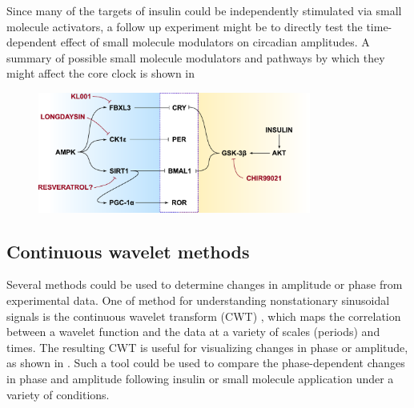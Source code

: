 Since many of the targets of insulin could be independently stimulated via small molecule activators, a follow up experiment might be to directly test the time-dependent effect of small molecule modulators on circadian amplitudes.
A summary of possible small molecule modulators and pathways by which they might affect the core clock is shown in 

\begin{figure}[tbp]
  \centering
  \includegraphics[width=0.8\textwidth]{chap7/figures/connectivity.pdf}
  \label{fig:small-molecule}
\end{figure}

\subsection{Continuous wavelet methods}\label{sec:cwt}

Several methods could be used to determine changes in amplitude or phase from experimental data.
One of method for understanding nonstationary sinusoidal signals is the continuous wavelet transform (CWT) \cite{Torrence1998}, which maps the correlation between a wavelet function and the data at a variety of scales (periods) and times.
The resulting CWT is useful for visualizing changes in phase or amplitude, as shown in .
Such a tool could be used to compare the phase-dependent changes in phase and amplitude following insulin or small molecule application under a variety of conditions.

